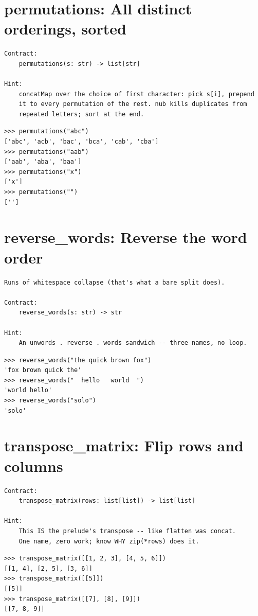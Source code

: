 \documentclass[10pt,letterpaper]{book}
\begin{document}
\section{permutations: All distinct orderings, sorted}
\begin{lstlisting}[style=ex]
Contract:
    permutations(s: str) -> list[str]

Hint:
    concatMap over the choice of first character: pick s[i], prepend
    it to every permutation of the rest. nub kills duplicates from
    repeated letters; sort at the end.
\end{lstlisting}
\begin{lstlisting}[style=ex]
>>> permutations("abc")
['abc', 'acb', 'bac', 'bca', 'cab', 'cba']
>>> permutations("aab")
['aab', 'aba', 'baa']
>>> permutations("x")
['x']
>>> permutations("")
['']
\end{lstlisting}

\section{reverse\_words: Reverse the word order}
\begin{lstlisting}[style=ex]
Runs of whitespace collapse (that's what a bare split does).

Contract:
    reverse_words(s: str) -> str

Hint:
    An unwords . reverse . words sandwich -- three names, no loop.
\end{lstlisting}
\begin{lstlisting}[style=ex]
>>> reverse_words("the quick brown fox")
'fox brown quick the'
>>> reverse_words("  hello   world  ")
'world hello'
>>> reverse_words("solo")
'solo'
\end{lstlisting}

\section{transpose\_matrix: Flip rows and columns}
\begin{lstlisting}[style=ex]
Contract:
    transpose_matrix(rows: list[list]) -> list[list]

Hint:
    This IS the prelude's transpose -- like flatten was concat.
    One name, zero work; know WHY zip(*rows) does it.
\end{lstlisting}
\begin{lstlisting}[style=ex]
>>> transpose_matrix([[1, 2, 3], [4, 5, 6]])
[[1, 4], [2, 5], [3, 6]]
>>> transpose_matrix([[5]])
[[5]]
>>> transpose_matrix([[7], [8], [9]])
[[7, 8, 9]]
\end{lstlisting}
\end{document}
